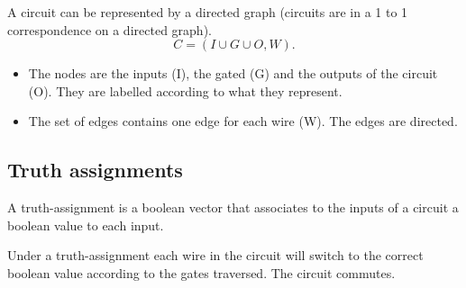 A circuit can be represented by a directed graph (circuits are in a 1 to 1 correspondence on a directed graph). 
\[
C=(I\cup G\cup O,W).
\]
\begin{itemize}
\item The nodes are the inputs (I), the gated (G) and the outputs of the circuit (O). They are labelled according to what they represent. 
\item The set of edges contains one edge for each wire (W). The edges are directed.
\end{itemize}

\subsection{Truth assignments} 
\begin{notesdefinition}
A truth-assignment is a boolean vector that associates to the inputs of a circuit a boolean value to each input.
\end{notesdefinition}

Under a truth-assignment each wire in the circuit will switch to the correct boolean value according to the gates traversed. The circuit commutes.
